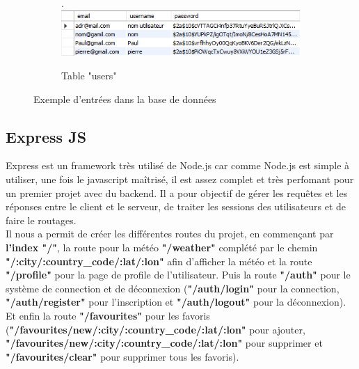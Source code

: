 \documentclass[12pt, french]{article}
\begin{document}
\begin{figure}[htbp]
            \hfill
            \begin{subfigure}{.45\textwidth}
                \hspace{-2.5cm}.
                \includegraphics[width=1.5\linewidth]{images/users.PNG}
                \caption{Table "users"} 
            \end{subfigure}
            \caption{Exemple d'entrées dans la base de données}
        \end{figure}
		
		\newpage
		\subsection{Express JS}
		Express \cite{ExpressJS} est un framework très utilisé de Node.js car comme Node.js est simple à utiliser, une fois le javascript maîtrisé, il est assez complet et très perfomant pour un premier projet avec du backend. Il a pour objectif de gérer les requêtes et les réponses entre le client et le serveur, de traiter les sessions des utilisateurs et de faire le routages. \\
		Il nous a permit de créer les différentes routes du projet, en commençant par \textbf{l'index "/"}, la route pour la météo \textbf{"/weather"} complété par le chemin \textbf{"/:city/:country\_code/:lat/:lon"} afin d'afficher la météo et la route \textbf{"/profile"} pour la page de profile de l'utilisateur. Puis la route \textbf{"/auth"} pour le système de connection et de déconnexion (\textbf{"/auth/login"} pour la connection, \textbf{"/auth/register"} pour l'inscription et \textbf{"/auth/logout"} pour la déconnexion). Et enfin la route \textbf{"/favourites"} pour les favoris (\textbf{"/favourites/new/:city/:country\_code/:lat/:lon"} pour ajouter, \textbf{"/favourites/new/:city/:country\_code/:lat/:lon"} pour supprimer et \textbf{"/favourites/clear"} pour supprimer tous les favoris).
		
\end{document}
